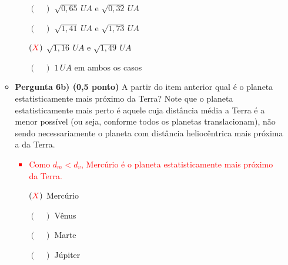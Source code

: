 \documentclass[a4paper, 12pt]{article}
\newcommand{\red}[1]{\textcolor{red}{#1}}
\begin{document}
\begin{flushleft}
\begin{itemize}
\begin{itemize}
{\begin{itemize}
                        \end{itemize}}
                        \begin{itemize}
                            \item[$(\quad)$] $\sqrt{0,65} \, UA$ e $\sqrt{0,32} \, UA$
                            \item[$(\quad)$] $\sqrt{1,41} \, UA$ e $\sqrt{1,73} \, UA$
                            \item[$(\red{X})$] $\sqrt{1,16} \, UA$ e $\sqrt{1,49} \, UA$
                            \item[$(\quad)$] $1 \, UA$ em ambos os casos
                        \end{itemize}
                    \item \textbf{Pergunta 6b) (0,5 ponto)} A partir do item anterior qual é o planeta estatisticamente mais próximo da Terra? Note que o planeta estatisticamente mais perto é aquele cuja distância média a Terra é a menor possível (ou seja, conforme todos os planetas translacionam), não sendo necessariamente o planeta com distância heliocêntrica mais próxima a da Terra.
                        \red{\begin{itemize}
                            \item Como $d_m<d_v$, Mercúrio é o planeta estatisticamente mais próximo da Terra.
                        \end{itemize}}
                        \begin{itemize}
                            \item[$(\red{X})$] Mercúrio
                            \item[$(\quad)$] Vênus
                            \item[$(\quad)$] Marte
                            \item[$(\quad)$] Júpiter
                        \end{itemize}
                \end{itemize}


\end{itemize}
\end{flushleft}
\end{document}
